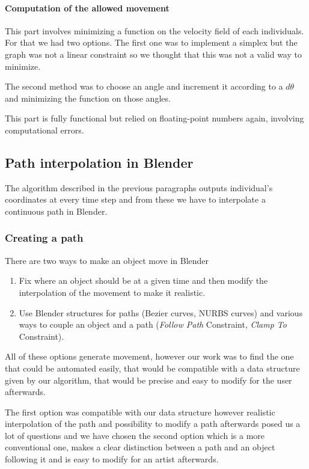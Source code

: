 \paragraph{Computation of the allowed movement}

This part involves minimizing a function on the velocity field of each
individuals. For that we had two options. The first one was to
implement a simplex but the graph was not a linear constraint so we
thought that this was not a valid way to minimize.

The second method was to choose an angle and increment it according to
a $d\theta$ and minimizing the function on those angles.


This part is fully functional but relied on floating-point numbers
again, involving computational errors.


\subsection{Path interpolation in Blender}

The algorithm described in the previous paragraphs outputs
individual's coordinates at every time step and from these we have to
interpolate a continuous path in Blender.


\subsubsection{Creating a path}

There are two ways to make an object move in Blender
\begin{enumerate}
\item Fix where an object should be at a given time and then modify
the interpolation of the movement to make it realistic.
\item Use Blender structures for paths (Bezier curves, NURBS curves)
and various ways to couple an object and a path (\textit{Follow Path}
Constraint, \textit{Clamp To} Constraint).
\end{enumerate}

All of these options generate movement, however our work was to find
the one that could be automated easily, that would be compatible with
a data structure given by our algorithm, that would be precise and
easy to modify for the user afterwards.

The first option was compatible with our data structure however
realistic interpolation of the path and possibility to modify a path
afterwards posed us a lot of questions and we have chosen the second
option which is a more conventional one, makes a clear distinction
between a path and an object following it and is easy to modify for an
artist afterwards.

